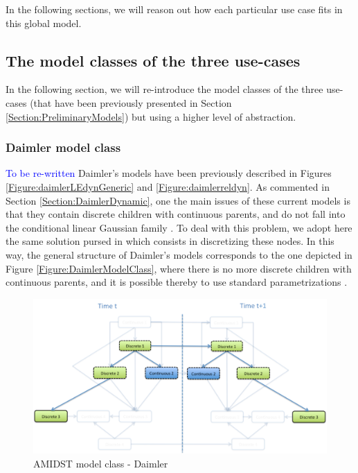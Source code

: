 In the following sections, we will reason out how each particular use case fits in this global model.

\subsection{The model classes of the three use-cases} \label{UseCaseModelClasses}

In the following section, we will re-introduce the model classes of the three use-cases (that have been previously presented in Section \ref{Section:PreliminaryModels}) but using a higher level of abstraction. 

\subsubsection{Daimler model class}

\textcolor{blue}{To be re-written}
Daimler's models have been previously described in Figures \ref{Figure:daimlerLEdynGeneric} and \ref{Figure:daimlerreldyn}. As commented in Section \ref{Section:DaimlerDynamic}, one the main issues of these current models is that they contain discrete children with continuous parents, and do not fall into the conditional linear Gaussian family \cite{JensenNielsen2007}. To deal with this problem, we adopt here the same solution pursed in \cite{kasper2012object} which consists in discretizing these nodes. In this way, the general structure of Daimler's models corresponds to the one depicted in Figure \ref{Figure:DaimlerModelClass}, where there is no more discrete children with continuous parents, and it is possible thereby to use standard parametrizations \cite{JensenNielsen2007}. 


\begin{figure}[ht!]
\begin{center}
\includegraphics[scale=0.39]{./figures/AMIDSTModelClassDaimler}
\caption{\label{Figure:AMIDSTModelClassDaimler} AMIDST model class - Daimler}
\end{center}
\end{figure}

